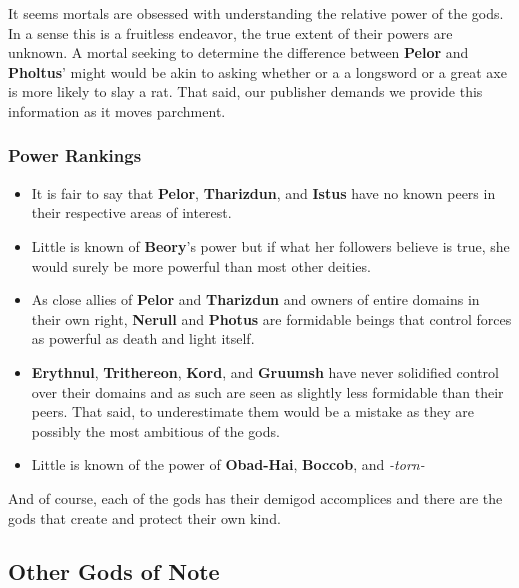 \documentclass[smalldemyvopaper,11pt,twoside,onecolumn,openright,extrafontsizes]{memoir}
\begin{document}
It seems mortals are obsessed with understanding the relative power of
the gods. In a sense this is a fruitless endeavor, the true extent of
their powers are unknown. A mortal seeking to determine the difference
between \textbf{Pelor} and \textbf{Pholtus}' might would be akin to
asking whether or a a longsword or a great axe is more likely to slay a
rat. That said, our publisher demands we provide this information as it
moves parchment.

\hypertarget{power-rankings}{%
\subsubsection{Power Rankings}\label{power-rankings}}

\begin{itemize}
\tightlist
\item
  It is fair to say that \textbf{Pelor}, \textbf{Tharizdun}, and
  \textbf{Istus} have no known peers in their respective areas of
  interest.
\item
  Little is known of \textbf{Beory}'s power but if what her followers
  believe is true, she would surely be more powerful than most other
  deities.
\item
  As close allies of \textbf{Pelor} and \textbf{Tharizdun} and owners of
  entire domains in their own right, \textbf{Nerull} and \textbf{Photus}
  are formidable beings that control forces as powerful as death and
  light itself.
\item
  \textbf{Erythnul}, \textbf{Trithereon}, \textbf{Kord}, and
  \textbf{Gruumsh} have never solidified control over their domains and
  as such are seen as slightly less formidable than their peers. That
  said, to underestimate them would be a mistake as they are possibly
  the most ambitious of the gods.
\item
  Little is known of the power of \textbf{Obad-Hai}, \textbf{Boccob},
  and \emph{-torn-}
\end{itemize}

And of course, each of the gods has their demigod accomplices and there
are the gods that create and protect their own kind.

\hypertarget{other-gods-of-note}{%
\subsection{Other Gods of Note}\label{other-gods-of-note}}
\end{document}
